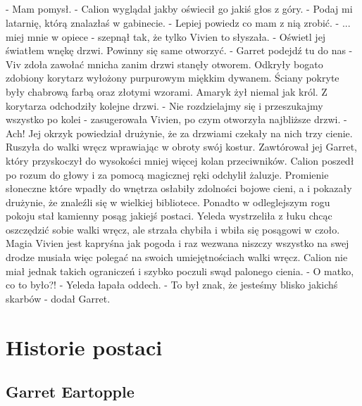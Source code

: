 \documentclass[10pt,twoside,twocolumn]{book}
\begin{document}
\paragraph{}
\indent - Mam pomysł. - Calion wyglądał jakby oświecił go jakiś głos z góry. - Podaj mi latarnię, którą znalazłaś w gabinecie.\newline
\indent - Lepiej powiedz co mam z nią zrobić.\newline
\indent - ... miej mnie w opiece - szepnął tak, że tylko Vivien to słyszała. - Oświetl jej światłem wnękę drzwi. Powinny się same otworzyć.\newline
\indent - Garret podejdź tu do nas - Viv zdoła zawołać mnicha zanim drzwi stanęły otworem. \newline
Odkryły bogato zdobiony korytarz wyłożony purpurowym miękkim dywanem. 
Ściany pokryte były chabrową farbą oraz złotymi wzorami. 
Amaryk  żył niemal jak król. 
Z korytarza odchodziły kolejne drzwi.
\indent - Nie rozdzielajmy się i przeszukajmy wszystko po kolei - zasugerowała Vivien, po czym otworzyła najbliższe drzwi. - Ach!\newline
Jej okrzyk powiedział drużynie, że za drzwiami czekały na nich trzy cienie. 
Ruszyła do walki wręcz wprawiając w obroty swój kostur. 
Zawtórował jej Garret, który przyskoczył do wysokości mniej więcej kolan przeciwników. 
Calion poszedł po rozum do głowy i za pomocą magicznej ręki odchylił żaluzje. 
Promienie słoneczne które wpadły do wnętrza osłabiły zdolności bojowe cieni, a i pokazały drużynie, że znaleźli się w wielkiej bibliotece. 
Ponadto w odleglejszym rogu pokoju stał kamienny posąg jakiejś postaci. 
Yeleda wystrzeliła z łuku chcąc oszczędzić sobie walki wręcz, ale strzała chybiła i wbiła się posągowi w czoło. 
Magia Vivien jest kapryśna jak pogoda i raz wezwana niszczy wszystko na swej drodze musiała więc polegać na swoich umiejętnościach walki wręcz.
Calion nie miał jednak takich ograniczeń i szybko poczuli swąd palonego cienia.\newline
\indent - O matko, co to było?! - Yeleda łapała oddech.\newline
\indent - To był znak, że jesteśmy blisko jakichś skarbów - dodał Garret.

\twocolumn
\normalsize
\chapter{Historie postaci}

\section{Garret Eartopple}
\end{document}
